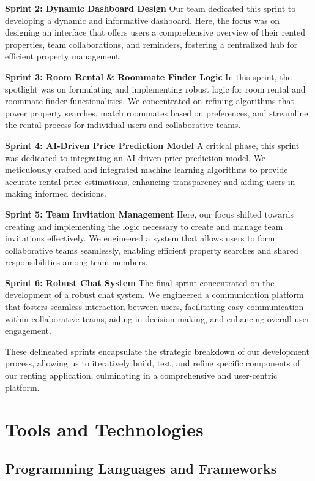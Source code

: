 \textbf{Sprint 2: Dynamic Dashboard Design}
Our team dedicated this sprint to developing a dynamic and informative dashboard. Here, the focus was on designing an interface that offers users a comprehensive overview of their rented properties, team collaborations, and reminders, fostering a centralized hub for efficient property management.\medskip

\textbf{Sprint 3: Room Rental \& Roommate Finder Logic}
In this sprint, the spotlight was on formulating and implementing robust logic for room rental and roommate finder functionalities. We concentrated on refining algorithms that power property searches, match roommates based on preferences, and streamline the rental process for individual users and collaborative teams.\medskip

\textbf{Sprint 4: AI-Driven Price Prediction Model}
A critical phase, this sprint was dedicated to integrating an AI-driven price prediction model. We meticulously crafted and integrated machine learning algorithms to provide accurate rental price estimations, enhancing transparency and aiding users in making informed decisions.\medskip

\textbf{Sprint 5: Team Invitation Management}
Here, our focus shifted towards creating and implementing the logic necessary to create and manage team invitations effectively. We engineered a system that allows users to form collaborative teams seamlessly, enabling efficient property searches and shared responsibilities among team members.\medskip

\textbf{Sprint 6: Robust Chat System}
The final sprint concentrated on the development of a robust chat system. We engineered a communication platform that fosters seamless interaction between users, facilitating easy communication within collaborative teams, aiding in decision-making, and enhancing overall user engagement.\par\bigskip

These delineated sprints encapsulate the strategic breakdown of our development process, allowing us to iteratively build, test, and refine specific components of our renting application, culminating in a comprehensive and user-centric platform.

\section{Tools and Technologies}

\subsection{Programming Languages and Frameworks}

